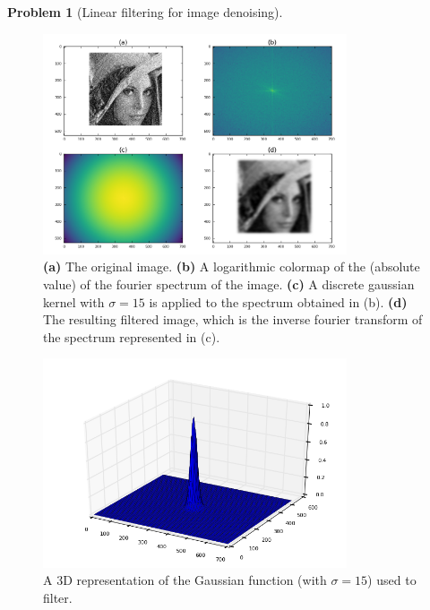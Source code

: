 \documentclass[10pt]{article}
\theoremstyle{plain}
\theoremstyle{definition}
\newtheorem{prob}{Problem}
\numberwithin{equation}{section}
\begin{document}
\begin{prob}[Linear filtering for image denoising]
    \begin{figure}[p]
    \begin{center}
        \includegraphics[width=0.8\textwidth]{prob4}
        \caption{
            \textbf{(a)} The original image.
            \textbf{(b)} A logarithmic colormap of the (absolute value) of the fourier spectrum of the image.
            \textbf{(c)} A discrete gaussian kernel with $\sigma=15$ is applied to the spectrum obtained in (b).
            \textbf{(d)} The resulting filtered image, which is the inverse fourier transform of the spectrum
                         represented in (c).
                     }
    \end{center}
\end{figure}
\begin{figure}[p]
    \begin{center}
        \includegraphics[width=0.8\textwidth]{p4-gaussian15}
        \caption{A 3D representation of the Gaussian function (with $\sigma=15$) used to filter.}
    \end{center}
\end{figure}
\begin{figure}[p]

\end{figure}
\end{prob}
\end{document}
